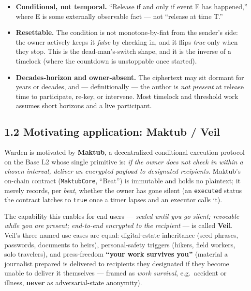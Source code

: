 \documentclass[
  11pt,
]{article}
\providecommand{\tightlist}{%
  \setlength{\itemsep}{0pt}\setlength{\parskip}{0pt}}
\begin{document}
\begin{itemize}
\tightlist
\item
  \textbf{Conditional, not temporal.} ``Release if and only if event E
  has happened,'' where E is some externally observable fact --- not
  ``release at time T.''
\item
  \textbf{Resettable.} The condition is not monotone-by-fiat from the
  sender's side: the owner actively keeps it \emph{false} by checking
  in, and it flips \emph{true} only when they stop. This is the
  dead-man's-switch shape, and it is the inverse of a timelock (where
  the countdown is unstoppable once started).
\item
  \textbf{Decades-horizon and owner-absent.} The ciphertext may sit
  dormant for years or decades, and --- definitionally --- the author is
  \emph{not present} at release time to participate, re-key, or
  intervene. Most timelock and threshold work assumes short horizons and
  a live participant.
\end{itemize}

\subsection{1.2 Motivating application: Maktub /
Veil}\label{motivating-application-maktub-veil}

Warden is motivated by \textbf{Maktub}, a decentralized
conditional-execution protocol on the Base L2 whose single primitive is:
\emph{if the owner does not check in within a chosen interval, deliver
an encrypted payload to designated recipients.} Maktub's on-chain
contract (\texttt{MaktubCore}, ``Beat'') is immutable and holds no
plaintext; it merely records, per \emph{beat}, whether the owner has
gone silent (an \texttt{executed} status the contract latches to
\texttt{true} once a timer lapses and an executor calls it).

The capability this enables for end users --- \emph{sealed until you go
silent; revocable while you are present; end-to-end encrypted to the
recipient} --- is called \textbf{Veil}. Veil's three named use cases are
equal: digital-estate inheritance (seed phrases, passwords, documents to
heirs), personal-safety triggers (hikers, field workers, solo
travelers), and press-freedom \textbf{``your work survives you''}
(material a journalist prepared is delivered to recipients they
designated if they become unable to deliver it themselves --- framed as
\emph{work survival}, e.g.~accident or illness, \textbf{never} as
adversarial-state anonymity).
\end{document}
